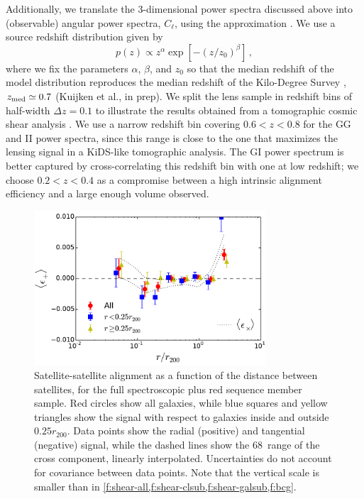 Additionally, we translate the 3-dimensional power spectra discussed above into (observable) 
angular power spectra, $C_\ell$, using the \cite{limber53} approximation \cite[e.g.,][]{kaiser92}. 
We use a source redshift distribution given by
\begin{equation}
 p(z) \propto z^\alpha \exp\left[-\left(z/z_0\right)^\beta\right]\,,
\end{equation}
where we fix the parameters $\alpha$, $\beta$, and $z_0$ so that the median redshift of the 
model distribution reproduces the median redshift of the Kilo-Degree Survey 
\citep[KiDS,][]{dejong13}, $z_{\rm med}\simeq0.7$ (Kuijken et al., in prep). We split the lens 
sample in redshift bins of half-width $\Delta z=0.1$ to illustrate the results obtained from a 
tomographic cosmic shear analysis \citep[e.g.,][]{heymans13}. We use a narrow redshift bin covering 
$0.6<z<0.8$ for the GG and II power spectra, since this range is close to the one that maximizes 
the lensing signal in a KiDS-like tomographic analysis. The GI power spectrum is better captured by 
cross-correlating this redshift bin with one at low redshift; we choose $0.2<z<0.4$ as a compromise 
between a high intrinsic alignment efficiency and a large enough volume observed. 

\begin{figure}
 \centerline{\includegraphics[width=3.4in]{chapter4/satsat.pdf}}
\caption{\small Satellite-satellite alignment as a function of the distance between satellites, 
for the full spectroscopic plus red sequence member sample. Red circles show all galaxies, while 
blue squares and yellow triangles show the signal with respect to galaxies inside and outside 
$0.25r_{200}$. Data points show the radial (positive) and tangential (negative) signal, while the 
dashed lines show the 68\percent\ range of the cross component, linearly interpolated. Uncertainties do 
not account for covariance between data points. Note that the vertical scale is smaller than in
\cref{f:shear-all,f:shear-clsub,f:shear-galsub,f:bcg}.}
\label{f:satsat}
\end{figure}

